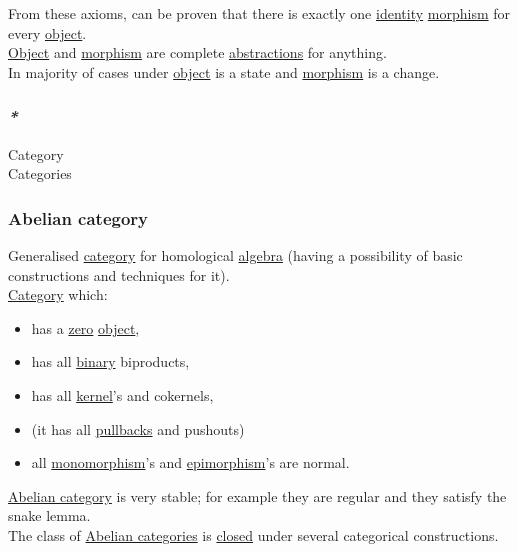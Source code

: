 \documentclass[11pt]{article}
\begin{document}
From these axioms, can be proven that there is exactly one \hyperref[org3bbbadd]{identity} \hyperref[orgad99fc6]{morphism} for every \hyperref[org025aac8]{object}.\\

\hyperref[org025aac8]{Object} and \hyperref[orgad99fc6]{morphism} are complete \hyperref[orgabcd7a1]{abstractions} for anything.\\
In majority of cases under \hyperref[org025aac8]{object} is a state and \hyperref[orgad99fc6]{morphism} is a change.\\

\subsubsection{\emph{*}}
\label{sec:org47ed2ff}

\label{org3e3a79b}Category\\
\label{org43ea200}Categories\\

\subsubsection{\label{org35d68c3}Abelian category}
\label{sec:org7a88c46}
Generalised \hyperref[org3e3a79b]{category} for homological \hyperref[orgecde2fc]{algebra} (having a possibility of basic constructions and techniques for it).\\

\hyperref[org3e3a79b]{Category} which:\\
\begin{itemize}
\item has a \hyperref[orgf8da8e8]{zero} \hyperref[org025aac8]{object},\\
\item has all \hyperref[orgee106ab]{binary} biproducts,\\
\item has all \hyperref[orge7061fe]{kernel}'s and cokernels,\\
\item (it has all \hyperref[org74e2585]{pullbacks} and pushouts)\\
\item all \hyperref[orgdcfcc77]{monomorphism}'s and \hyperref[org2e893f9]{epimorphism}'s are normal.\\
\end{itemize}
\hyperref[org35d68c3]{Abelian category} is very stable; for example they are regular and they satisfy the snake lemma.\\
The class of \hyperref[orgf0bcdf5]{Abelian categories} is \hyperref[orgfa67abb]{closed} under several categorical constructions.\\
\end{document}
